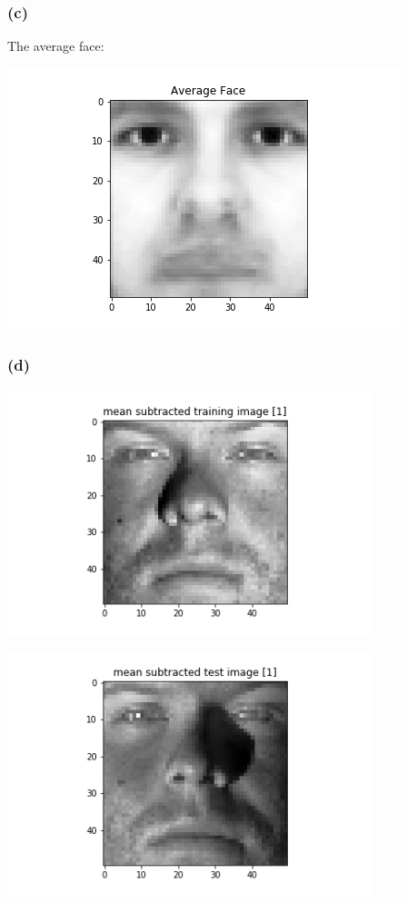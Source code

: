 \documentclass[12pt]{article}
\begin{document}
{\subsubsection*{(c)}
The average face: 

\includegraphics[scale=1]{P1/Average_Face.png}

\subsubsection*{(d)}
\includegraphics[width=0.8\textwidth]{P1/mean_subtracted_training_image_[1].png}
 
\includegraphics[width=0.8\textwidth]{P1/mean_subtracted_test_image_[1].png}

}
\end{document}
